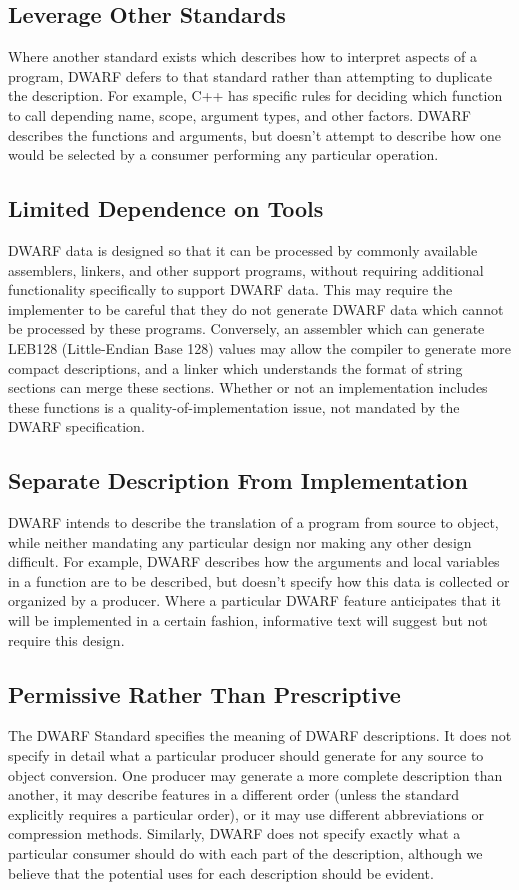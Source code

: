 \subsection{Leverage Other Standards}
Where another standard exists which describes how to interpret 
aspects of a program, DWARF defers to that standard rather than 
attempting to duplicate the description.  For example, C++ has 
specific rules for deciding which function to call depending 
name, scope, argument types, and other factors.  DWARF describes 
the functions and arguments, but doesn't attempt to describe 
how one would be selected by a consumer performing any particular 
operation.

\subsection{Limited Dependence on Tools}
DWARF data is designed so that it can be processed by commonly 
available assemblers, linkers, and other support programs, 
without requiring additional functionality specifically to 
support DWARF data.  This may require the implementer to be 
careful that they do not generate DWARF data which cannot be 
processed by these programs.  Conversely, an assembler which 
can generate LEB128 (Little-Endian Base 128) 
values may allow the compiler to generate 
more compact descriptions, and a linker which understands the 
format of string sections can merge these sections.  Whether 
or not an implementation includes these functions is a 
quality-of-implementation issue, not mandated by the DWARF 
specification.

\subsection{Separate Description From Implementation}
DWARF intends to describe the translation of a program from 
source to object, while neither mandating any particular design 
nor making any other design difficult.  For example, DWARF 
describes how the arguments and local variables in a function 
are to be described, but doesn't specify how this data is 
collected or organized by a producer.  Where a particular DWARF 
feature anticipates that it will be implemented in a certain 
fashion, informative text will suggest but not require this design.

\subsection{Permissive Rather Than Prescriptive}
\bb
The DWARF Standard specifies the meaning of DWARF descriptions. It does not
specify in detail what a particular producer should generate for any source to
object conversion.  One producer may generate a more complete description
than another, it may describe features in a different order (unless the 
standard explicitly requires a particular order), or it may use
different abbreviations or compression methods.  Similarly, DWARF does not
specify exactly what a particular consumer should do with each part of the
description, although we believe that the potential uses for each description
should be evident.


